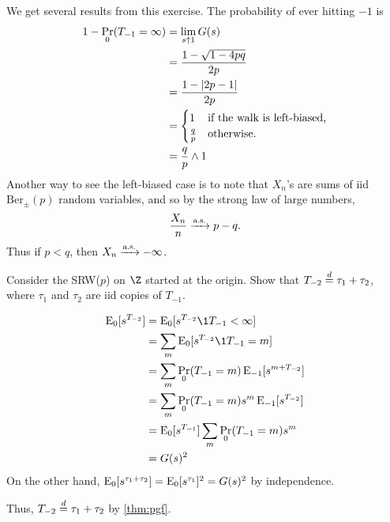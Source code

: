 We get several results from this exercise.
The probability of ever hitting $-1$ is \begin{align*}
    1 - \Pr_0(T_{-1} = \infty) &= \lim_{s \uparrow 1} G(s) \\
        &= \frac{1 - \sqrt{1 - 4pq}}{2p} \\
        &= \frac{1 - \abs{2p - 1}}{2p} \\
        &= \begin{cases}
            1 & \text{if the walk is left-biased,} \\
            \frac{q}{p} & \text{otherwise.}
        \end{cases} \\
        &= \frac{q}{p} \wedge 1
\end{align*}
Another way to see the left-biased case is to note that $X_n$'s are sums of
iid $\mathrm{Ber}_{\pm}(p)$ random variables, and so by the strong law of
large numbers, \[
    \frac{X_n}{n} \xrightarrow{\text{a.s.}} p - q.
\] Thus if $p < q$, then $X_n \xrightarrow{\text{a.s.}} -\infty$.

\begin{exercise}
    Consider the SRW($p$) on $\Z$ started at the origin.
    Show that $T_{-2} \overset{d}{=} \tau_1 + \tau_2$, where $\tau_1$ and $\tau_2$ are
    iid copies of $T_{-1}$.
\end{exercise}
\begin{solution}
    \begin{align*}
        \E_0[s^{T_{-2}}] &= \E_0[s^{T_{-2}} \1{T_{-1} < \infty}] \\
            &= \sum_m \E_0[s^{T_{-2}} \1{T_{-1} = m}] \\
            &= \sum_m \Pr_0(T_{-1} = m) \E_{-1}[s^{m + T_{-2}}] \\
            &= \sum_m \Pr_0(T_{-1} = m) s^m \E_{-1}[s^{T_{-2}}] \\
            &= \E_0[s^{T_{-1}}] \sum_m \Pr_0(T_{-1} = m) s^m \\
            &= G(s)^2
    \end{align*}
    On the other hand, $\operatorname{\mathrm{E}}_0[s^{\tau_1 + \tau_2}] = \operatorname{\mathrm{E}}_0[s^{\tau_1}]^2
    = G(s)^2$ by independence.

    Thus, $T_{-2} \overset{d}{=} \tau_1 + \tau_2$ by \cref{thm:pgf}.
\end{solution}

